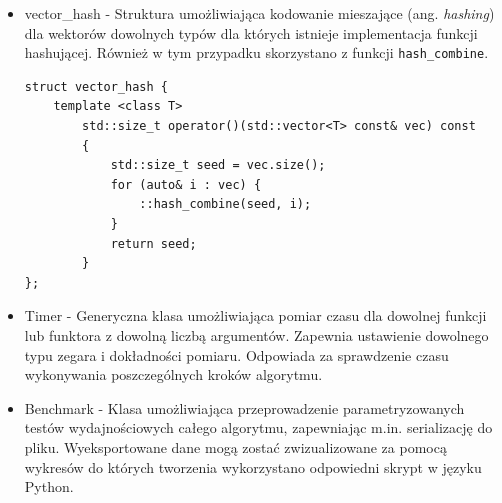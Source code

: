 \documentclass[12pt]{article}
\def\inline{\lstinline[basicstyle=\ttfamily,keywordstyle={}]}
\begin{document}
\begin{itemize}
\item vector\_hash - Struktura umożliwiająca kodowanie mieszające (ang. \textit{hashing}) dla wektorów dowolnych typów dla których istnieje implementacja funkcji hashującej. Również w tym przypadku skorzystano z funkcji \inline{hash_combine}.

\begin{minipage}{\linewidth}
\begin{lstlisting}[caption={Kod struktury vector\_hash}]
struct vector_hash {
	template <class T>
		std::size_t operator()(std::vector<T> const& vec) const
        {
            std::size_t seed = vec.size();
            for (auto& i : vec) {
                ::hash_combine(seed, i);
            }
			return seed;
		}
};
\end{lstlisting}
\end{minipage}


\item Timer - Generyczna klasa umożliwiająca pomiar czasu dla dowolnej funkcji lub funktora z dowolną liczbą argumentów. Zapewnia ustawienie dowolnego typu zegara i dokładności pomiaru. Odpowiada za sprawdzenie czasu wykonywania poszczególnych kroków algorytmu.

\item Benchmark - Klasa umożliwiająca przeprowadzenie parametryzowanych testów wydajnościowych całego algorytmu, zapewniając m.in. serializację do pliku. Wyeksportowane dane mogą zostać zwizualizowane za pomocą wykresów do których tworzenia wykorzystano odpowiedni skrypt w języku Python.

\end{itemize}
\end{document}
